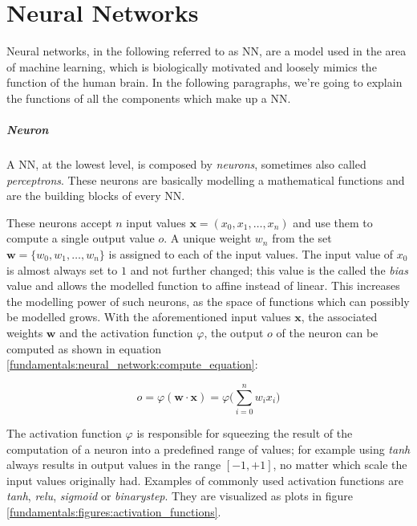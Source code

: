 \chapter{Neural Networks}
\label{fundamentals:neural_network}

Neural networks, in the following referred to as NN, are a model used in the area of machine learning, which is biologically motivated and loosely mimics the function of the human brain. In the following paragraphs, we're going to explain the functions of all the components which make up a NN.

\paragraph{Neuron}\label{basic:neural_network:neuron} A NN, at the lowest level, is composed by \emph{neurons}, sometimes also called \emph{perceptrons}. These neurons are basically modelling a mathematical functions and are the building blocks of every NN.

These neurons accept $n$ input values $\mathbf{x} = (x_0, x_1, \dots, x_n)$ and use them to compute a single output value $o$. A unique weight $w_n$ from the set $\mathbf{w} = \{w_0, w_1, \dots, w_n\}$ is assigned to each of the input values. The input value of $x_0$ is almost always set to $1$ and not further changed; this value is the called the \emph{bias} value and allows the modelled function to affine instead of linear. This increases the modelling power of such neurons, as the space of functions which can possibly be modelled grows. With the aforementioned input values $\mathbf{x}$, the associated weights $\mathbf{w}$ and the activation function $\varphi$, the output $o$ of the neuron can be computed as shown in equation \ref{fundamentals:neural_network:compute_equation}:

\begin{equation}
o = \varphi(\mathbf{w} \cdot \mathbf{x}) = \varphi\bigg(\sum_{i=0}^{n} w_i x_i\bigg)
\label{fundamentals:neural_network:compute_equation}
\end{equation}

The activation function $\varphi$ is responsible for squeezing the result of the computation of a neuron into a predefined range of values; for example using \emph{tanh} always results in output values in the range $[-1, +1]$, no matter which scale the input values originally had. Examples of commonly used activation functions are \emph{tanh}, \emph{relu}, \emph{sigmoid} or \emph{binarystep}. They are visualized as plots in figure \ref{fundamentals:figures:activation_functions}.

